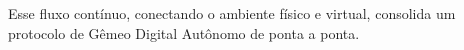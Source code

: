 \documentclass[
    12pt,                %
    openright,           %
    oneside,             %
    a4paper,             %
    english,             %
    spanish,             %
    brazil               %
]{ufscar}
\begin{document}
Esse fluxo contínuo, conectando o ambiente físico e virtual, consolida um protocolo de Gêmeo Digital Autônomo de ponta a ponta.



















%
%

\end{document}
